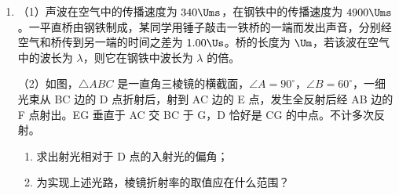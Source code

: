 \documentclass[\gkver]{gaokaozhenti}
\begin{document}
\begin{enumerate}
{（2）开始时活塞位于 a 处，加热后，汽缸中的气体先经历等容过程，直至活塞开始运动。设此时汽缸中气体的温度为 $T_{1}$，压强为 $p_{1}$，由查理定律得 $\frac{p_{0}}{T_{0}}=\frac{p_{1}}{T_{1}}$①，由力的平衡条件得 $p_{1}S=p_{0}S+mg$②，联立①②式可得 $T_{1}=\left(1+\frac{mg}{p_{0}S}\right)T_{0}$③。此后，汽缸中的气体经历等压过程，直至活塞刚好到达 b 处，设此时汽缸中气体的温度为 $T_{2}$；活塞位于 a 处和 b 处时气体的体积分别为 $V_{1}$ 和 $V_{2}$，由盖-吕萨克定律得 $\frac{V_{1}}{T_{1}}=\frac{V_{2}}{T_{2}}$④，式中 $V_{1}=SH$⑤，$V_{2}=S(H+h)$⑥，联立③④⑤⑥式解得 $T_{2}=\left(1+\frac{h}{H}\right)\left(1+\frac{mg}{p_{0}S}\right)T_{0}$⑦。从开始加热到活塞到达 b 处的过程中，汽缸中的气体对外做的功为 $W=(p_{0}S+mg)h$⑧。
}

\item
（1）声波在空气中的传播速度为 $340\Ums$，在钢铁中的传播速度为 $4900\Ums$。一平直桥由钢铁制成，某同学用锤子敲击一铁桥的一端而发出声音，分别经空气和桥传到另一端的时间之差为 $1.00\Us$。桥的长度为 $\Um$，若该波在空气中的波长为 $\lambda$，则它在钢铁中波长为 $\lambda$ 的倍。

（2）如图，$\triangle ABC$ 是一直角三棱镜的横截面，$\angle A=90^{\circ}$，$\angle B=60^{\circ}$，一细光束从 BC 边的 D 点折射后，射到 AC 边的 E 点，发生全反射后经 AB 边的 F 点射出。EG 垂直于 AC 交 BC 于 G，D 恰好是 CG 的中点。不计多次反射。
\begin{enumerate}
	\item
	求出射光相对于 D 点的入射光的偏角；
	\item
	为实现上述光路，棱镜折射率的取值应在什么范围？
\end{enumerate}


\end{enumerate}
\end{document}
